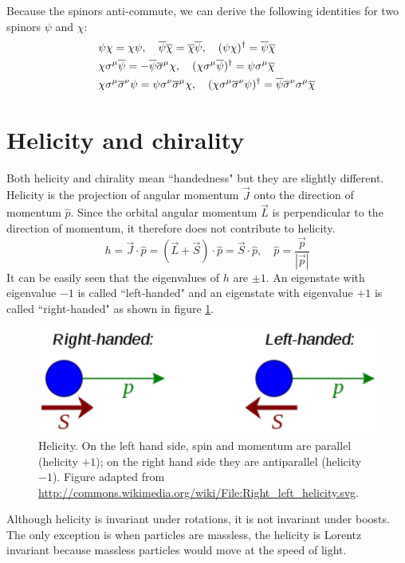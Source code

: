 \documentclass[12pt]{report}
\begin{document}
Because the spinors anti-commute, we can derive the following identities for two spinors $\psi$ and $\chi$:
\begin{align}
& \psi \chi = \chi \psi, \quad 
\overline{\psi} \overline{\chi} = \overline{\chi} \overline{\psi}, \quad 
(\psi \chi)^{\dagger} = \overline{\psi} \overline{\chi} \notag \\
& \chi \sigma^{\mu} \overline{\psi} = - \overline{\psi} \overline{\sigma}^{\mu} \chi, \quad 
(\chi \sigma^{\mu} \overline{\psi})^{\dagger} = \psi \sigma^{\mu} \overline{\chi} \notag \\
& \chi \sigma^{\mu} \overline{\sigma}^{\nu} \psi = \psi \sigma^{\nu} \overline{\sigma}^{\mu} \chi, \quad 
(\chi \sigma^{\mu} \overline{\sigma}^{\nu} \psi)^{\dagger} = \overline{\psi} \overline{\sigma}^{\nu} \sigma^{\mu} \overline{\chi}
\end{align}



\section{Helicity and chirality}
Both helicity and chirality mean ``handedness" but they are slightly different.
Helicity is the projection of angular momentum $\vec{J}$ onto the direction of momentum $\hat{p}$.
Since the orbital angular momentum $\vec{L}$ is perpendicular to the direction of momentum, it therefore does not contribute to helicity.
\begin{equation}
h = \vec{J} \cdot \hat{p} = (\vec{L} + \vec{S}) \cdot \hat{p} = \vec{S} \cdot \hat{p}, \quad 
\hat{p} = \frac{\vec{p}}{|\vec{p}|}
\end{equation}
It can be easily seen that the eigenvalues of $h$ are $\pm 1$.
An eigenstate with eigenvalue $-1$ is called ``left-handed" and an eigenstate with eigenvalue $+1$ is called ``right-handed" as shown in figure \ref{fig: helicity}.
\begin{figure}
\centering
\includegraphics[scale=0.8]{figures/380px-Right_left_helicity.pdf}
\caption{Helicity. On the left hand side, spin and momentum are parallel (helicity $+1$); on the right hand side they are antiparallel (helicity $-1$). Figure adapted from \url{http://commons.wikimedia.org/wiki/File:Right\_left\_helicity.svg}.}
\label{fig: helicity}
\end{figure}
Although helicity is invariant under rotations, it is not invariant under boosts.
The only exception is when particles are massless, the helicity is Lorentz invariant because massless particles would move at the speed of light.
\end{document}
